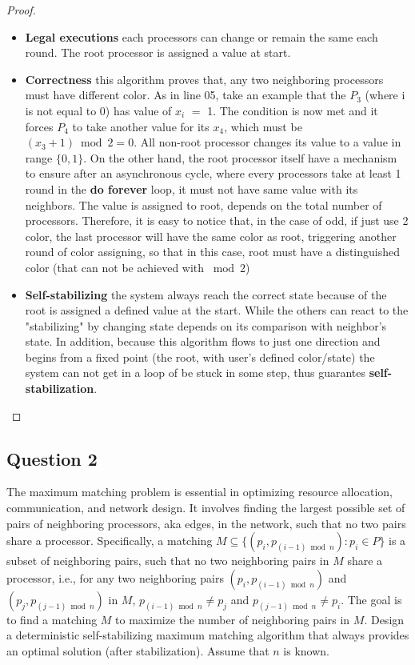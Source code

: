 \documentclass[12pt]{article}
\begin{document}
\begin{proof}
\begin{itemize}
    \item \textbf{Legal executions} each processors can change or remain the same each round. The root processor is assigned
    a value at start.
    \item \textbf{Correctness} this algorithm proves that, any two neighboring processors must have different color.
    As in line 05, take an example that the $P_3$ (where i is not equal to 0) has value of $x_i$ $=$ 1. The condition is 
    now met and it forces $P_4$ to take another value for its $x_4$, which must be $(x_3 + 1) \bmod 2 = 0$. All non-root processor 
    changes its value to a value in range $\{0,1\}$. On the other hand, the root processor itself have a mechanism to ensure 
    after an asynchronous cycle, where every processors take at least 1 round in the \textbf{do forever} loop, it must not have
    same value with its neighbors. The value is assigned to root, depends on the total number of processors. Therefore, it is easy
    to notice that, in the case of odd, if just use 2 color, the last processor will have the same color as root, triggering another
    round of color assigning, so that in this case, root must have a distinguished color (that can not be achieved with $\bmod 2$)
    \item \textbf{Self-stabilizing} the system always reach the correct state because of the root is assigned a defined value at 
    the start. While the others can react to the "stabilizing" by changing state depends on its comparison with neighbor's state.
    In addition, because this algorithm flows to just one direction and begins from a fixed point (the root, with user's defined color/state)
    the system can not get in a loop of be stuck in some step, thus guarantes \textbf{self-stabilization}.
\end{itemize}
\end{proof}

\subsection*{Question 2}

The maximum matching problem is essential in optimizing resource allocation,
communication, and network design. It involves finding the largest possible set
of pairs of neighboring processors, aka edges, in the network, such that no two pairs
share a processor. Specifically, a matching $M \subseteq \{(p_i, p_{(i-1) \bmod n}) : p_i \in P\}$ 
is a subset of neighboring pairs, such that no two neighboring pairs in $M$ share a processor, 
i.e., for any two neighboring pairs $(p_i, p_{(i-1) \bmod n})$ and $(p_j, p_{(j-1) \bmod n})$ in $M$, 
$p_{(i-1) \bmod n} \neq p_j$ and $p_{(j-1) \bmod n} \neq p_i$. The goal is to find a matching 
$M$ to maximize the number of neighboring pairs in $M$. Design a deterministic 
self-stabilizing maximum matching algorithm that always provides an optimal 
solution (after stabilization). Assume that $n$ is known.
\end{document}
